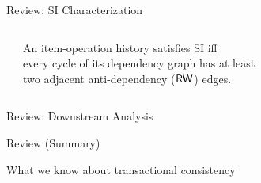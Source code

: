 \begin{frame}{Review: SI Characterization}
  \begin{columns}[c,onlytextwidth]
      \begin{center}
         \\[1em]
      \end{center}
      \begin{center}
        \begin{theorem}
          An item-operation history satisfies SI iff \\
          every cycle of its dependency graph has at least \\
          two adjacent anti-dependency ($\mathsf{RW}$) edges.
        \end{theorem}
      \end{center}
  \end{columns}
\end{frame}

\begin{frame}{Review: Downstream Analysis}
  \begin{center}
    
  \end{center}
\end{frame}

\begin{frame}{Review (Summary)}
  \begin{center}
    \vspace{.6em}
    {\LARGE What we know about transactional consistency}\\[.35em]
    {\LARGE{}}
  \end{center}
  \vfill
  \begin{center}
  \end{center}
\end{frame}